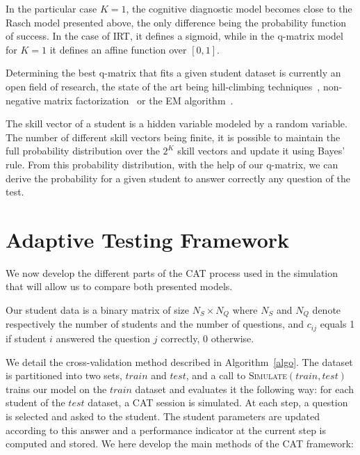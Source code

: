 \documentclass{sig-alternate}
\begin{document}
In the particular case $K=1$, the cognitive diagnostic model becomes close to the Rasch model presented above, the only difference being the probability function of success. In the case of IRT, it defines a sigmoid, while in the q-matrix model for $K = 1$ it defines an affine function over $[0,1]$.

Determining the best q-matrix that fits a given student dataset is currently an open field of research, the state of the art being hill-climbing techniques~\cite{Barnes2005}, non-negative matrix factorization~\cite{Desmarais2011} or the EM algorithm~\cite{Huebner2010}. 

The skill vector of a student is a hidden variable modeled by a random variable. The number of different skill vectors being finite, it is possible to maintain the full probability distribution over the $2^K$ skill vectors and update it using Bayes' rule. From this probability distribution, with the help of our q-matrix, we can derive the probability for a given student to answer correctly any question of the test.



\section{Adaptive Testing Framework}

We now develop the different parts of the CAT process used in the simulation that will allow us to compare both presented models.

Our student data is a binary matrix of size $N_S \times N_Q$ where $N_S$ and $N_Q$ denote respectively the number of students and the number of questions, and $c_{ij}$ equals 1 if student $i$ answered the question $j$ correctly, 0 otherwise. 

We detail the cross-validation method described in Algorithm~\ref{algo}. The dataset is partitioned into two sets, $train$ and $test$, and a call to \textsc{Simulate}$(train, test)$ trains our model on the $train$ dataset and evaluates it the following way: for each student of the $test$ dataset, a CAT session is simulated. At each step, a question is selected and asked to the student. The student parameters are updated according to this answer and a performance indicator at the current step is computed and stored. We here develop the main methods of the CAT framework:
\end{document}
